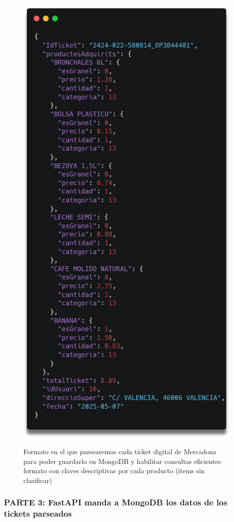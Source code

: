 \documentclass[a4paper,12pt]{report}
\begin{document}
		\FloatBarrier
		\setlength{\belowcaptionskip}{3pt}
		\begin{figure}[H]
			\centering
			\caption{Formato en el que parsearemos cada ticket digital de Mercadona para poder guardarlo en MongoDB y habilitar consultas eficientes formato con claves descriptivas por cada producto (items sin clasificar)}
			\includegraphics[width=.75\linewidth]{img/ticketJsonEstructuratMostraAMBCLAUS}
			\label{fig:ticketJsonEstructuratMostraAMBCLAUS}
		\end{figure}
		\FloatBarrier
		
		
	
		
		\subsubsection{PARTE 3: FastAPI manda a MongoDB los datos de los tickets parseados}
		\label{sec:PARTE3_FASTAPI}
		
\end{document}
